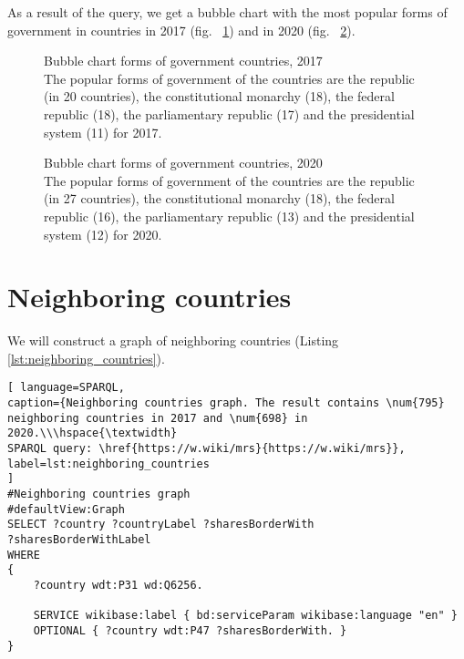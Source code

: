 
As a result of the query, we get a bubble chart with the most popular forms of government in countries in 2017 (fig. ~\ref{fig:bubble_chart_forms_of_government_countries_2017}) and in 2020 (fig. ~\ref{fig:bubble_chart_forms_of_government_countries_2020}).

\begin{figure}
	{
		\setlength{\fboxsep}{0pt}%
		\setlength{\fboxrule}{1pt}%
	}
	\caption{Bubble chart forms of government countries, 2017
		\\ The popular forms of government of the countries are the republic (in 20 countries), the constitutional monarchy (18), the federal republic (18), the parliamentary republic (17) and the presidential system (11) for 2017.
	}%
	\label{fig:bubble_chart_forms_of_government_countries_2017}%
\end{figure}

\begin{figure}
	{
		\setlength{\fboxsep}{0pt}%
		\setlength{\fboxrule}{1pt}%
	}
	\caption{Bubble chart forms of government countries, 2020
		\\ 
		The popular forms of government of the countries are the republic (in 27 countries), the constitutional monarchy (18), the federal republic (16), the parliamentary republic (13) and the presidential system (12) for 2020.
	}%
	\label{fig:bubble_chart_forms_of_government_countries_2020}%
\end{figure}

\section{Neighboring countries}

We will construct a graph of neighboring countries (Listing \ref{lst:neighboring_countries}).

\begin{lstlisting}[ language=SPARQL, 
caption={Neighboring countries graph. The result contains \num{795} neighboring countries in 2017 and \num{698} in 2020.\\\hspace{\textwidth}
SPARQL query: \href{https://w.wiki/mrs}{https://w.wiki/mrs}},
label=lst:neighboring_countries
]
#Neighboring countries graph
#defaultView:Graph
SELECT ?country ?countryLabel ?sharesBorderWith 
?sharesBorderWithLabel
WHERE
{
	?country wdt:P31 wd:Q6256.
	
	SERVICE wikibase:label { bd:serviceParam wikibase:language "en" }
	OPTIONAL { ?country wdt:P47 ?sharesBorderWith. }
}
\end{lstlisting}

